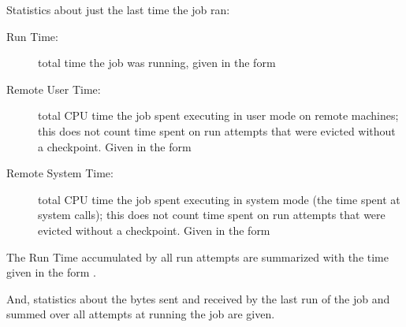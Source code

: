 Statistics about just the last time the job ran:

\begin{description}
\item[Run Time:] total time the job was running,
given in the form 

\item[Remote User Time:] total CPU time the job spent
executing in user mode on remote machines; 
this does not count time spent on run attempts that were evicted 
without a checkpoint.
Given in the form 

\item[Remote System Time:] total CPU time the job spent
executing in system mode (the time spent at system calls);
this does not count time spent on run attempts that were evicted 
without a checkpoint.  
Given in the form 

\end{description}

The Run Time accumulated by all run attempts are summarized with
the time given in the form .

And, statistics about the bytes sent and received by the last
run of the job and summed over all attempts at running the job
are given.
